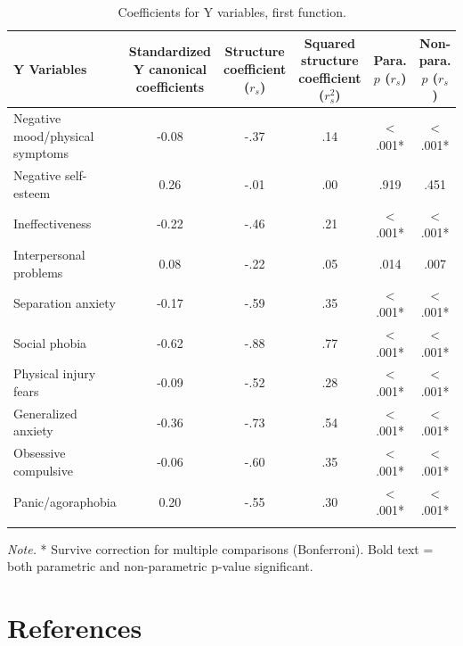 \documentclass[
  english,
  man,floatsintext]{apa6}
\begin{document}
\begin{table}[tbp]

\begin{center}
\begin{threeparttable}

\caption{\label{tab:alt2_coeffytable}Coefficients for Y variables, first function.}

\small{

\begin{tabular}{lccccc}
\toprule
Y Variables & Standardized Y canonical coefficients & Structure coefficient ($r_{s}$) & Squared structure coefficient ($r^{2}_{s}$) & Para. $p$ ($r_{s}$) & Non-para. $p$ ($r_{s}$)\\
\midrule
Negative mood/physical symptoms & -0.08 & -.37 & .14 & < .001* & < .001*\\
Negative self-esteem & 0.26 & -.01 & .00 & .919 & .451\\
Ineffectiveness & -0.22 & -.46 & .21 & < .001* & < .001*\\
Interpersonal problems & 0.08 & -.22 & .05 & .014 & .007\\
Separation anxiety & -0.17 & -.59 & .35 & < .001* & < .001*\\
Social phobia & -0.62 & -.88 & .77 & < .001* & < .001*\\
Physical injury fears & -0.09 & -.52 & .28 & < .001* & < .001*\\
Generalized anxiety & -0.36 & -.73 & .54 & < .001* & < .001*\\
Obsessive compulsive & -0.06 & -.60 & .35 & < .001* & < .001*\\
Panic/agoraphobia & 0.20 & -.55 & .30 & < .001* & < .001*\\
\bottomrule
\addlinespace
\end{tabular}

}

\begin{tablenotes}[para]
\normalsize{\textit{Note.} * Survive correction for multiple comparisons (Bonferroni). Bold text = both 
          parametric and non-parametric p-value significant.}
\end{tablenotes}

\end{threeparttable}
\end{center}

\end{table}

\newpage

\hypertarget{references}{%
\section{References}\label{references}}
\end{document}
